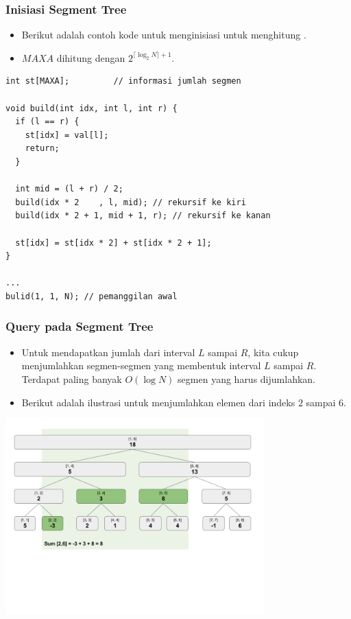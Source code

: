 \begin{frame}[fragile]
\frametitle{Inisiasi Segment Tree}
\begin{itemize}
  \item Berikut adalah contoh kode untuk menginisiasi \fsegmentTree untuk menghitung \frangeSumQuery.
  \item $MAXA$ dihitung dengan $2^{\lceil \log_{2}N \rceil + 1}$.
\end{itemize}
\begin{lstlisting}
int st[MAXA];         // informasi jumlah segmen

void build(int idx, int l, int r) {
  if (l == r) {
    st[idx] = val[l];
    return;
  }

  int mid = (l + r) / 2;
  build(idx * 2    , l, mid); // rekursif ke kiri
  build(idx * 2 + 1, mid + 1, r); // rekursif ke kanan
  
  st[idx] = st[idx * 2] + st[idx * 2 + 1];
}

...
bulid(1, 1, N); // pemanggilan awal
\end{lstlisting}
\end{frame}

\begin{frame}
\frametitle{Query pada Segment Tree}
\begin{itemize}
  \item Untuk mendapatkan jumlah dari interval $L$ sampai $R$, kita cukup menjumlahkan segmen-segmen yang membentuk interval $L$ sampai $R$. Terdapat paling banyak $O(\log N)$ segmen yang harus dijumlahkan.
  \item Berikut adalah ilustrasi untuk menjumlahkan elemen dari indeks $2$ sampai $6$.
\end{itemize}
\begin{center}
  \includegraphics[width=10cm]{asset/segtree-sum.png}
\end{center}
\end{frame}


